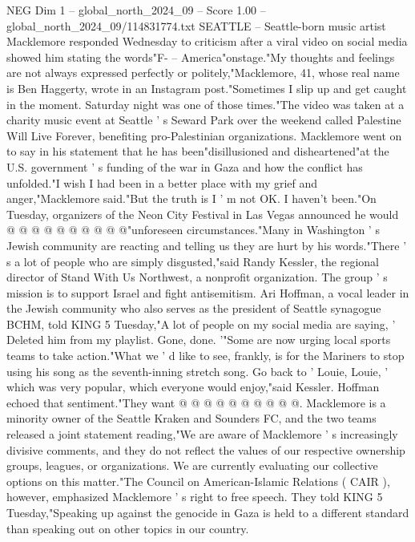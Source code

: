 \begin{textsample}{NEG Dim 1 – global\_north\_2024\_09 – Score 1.00 – global\_north\_2024\_09/114831774.txt}  \label{ex:f1_neg_361}
SEATTLE -- Seattle-born music artist Macklemore responded Wednesday to criticism after a viral video on social media showed him stating the words"F- -- America"onstage."My thoughts and feelings are not always expressed perfectly or politely,"Macklemore, 41, whose real name is Ben Haggerty, wrote in an Instagram post."Sometimes I slip up and get caught in the moment.
Saturday night was one of those times."The video was taken at a charity music event at Seattle ' s Seward Park over the weekend called Palestine Will Live Forever, benefiting pro-Palestinian organizations.
Macklemore went on to say in his statement that he has been"disillusioned and disheartened"at the U.S. government ' s funding of the war in Gaza and how the conflict has unfolded."I wish I had been in a better place with my grief and anger,"Macklemore said."But the truth is I ' m not OK.
I haven't been."On Tuesday, organizers of the Neon City Festival in Las Vegas announced he would @ @ @ @ @ @ @ @ @ @"unforeseen circumstances."Many in Washington ' s Jewish community are reacting and telling us they are hurt by his words."There ' s a lot of people who are simply disgusted,"said Randy Kessler, the regional director of Stand With Us Northwest, a nonprofit organization.
The group ' s mission is to support Israel and fight antisemitism.
Ari Hoffman, a vocal leader in the Jewish community who also serves as the president of Seattle synagogue BCHM, told KING 5 Tuesday,"A lot of people on my social media are saying, ' Deleted him from my playlist.
Gone, done. '"Some are now urging local sports teams to take action."What we ' d like to see, frankly, is for the Mariners to stop using his song as the seventh-inning stretch song.
Go back to ' Louie, Louie, ' which was very popular, which everyone would enjoy,"said Kessler.
Hoffman echoed that sentiment."They want @ @ @ @ @ @ @ @ @ @.
Macklemore is a minority owner of the Seattle Kraken and Sounders FC, and the two teams released a joint statement reading,"We are aware of Macklemore ' s increasingly divisive comments, and they do not reflect the values of our respective ownership groups, leagues, or organizations.
We are currently evaluating our collective options on this matter."The Council on American-Islamic Relations ( CAIR ), however, emphasized Macklemore ' s right to free speech.
They told KING 5 Tuesday,"Speaking up against the genocide in Gaza is held to a different standard than speaking out on other topics in our country.

\end{textsample}
